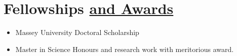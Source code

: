 \section{Fellowships \href{.}{and Awards}}

\begin{itemize}
    \itemsep-1mm
    \item Massey University Doctoral Scholarship %
    \item Master in Science Honours and research work with meritorious award.
\end{itemize}
